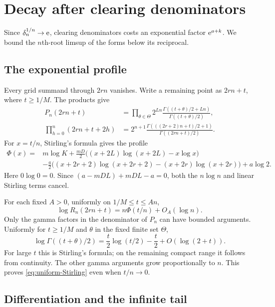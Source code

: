 \section{Decay after clearing denominators}\label{sec:decay}

Since $\delta_n^{1/n}\to\mathrm e$, clearing denominators costs an
exponential factor $\mathrm e^{a+k}$. We bound the $n$th-root limsup
of the forms below its reciprocal.

\subsection{The exponential profile}

Every grid summand through $2rn$ vanishes. Write a remaining
point as $2rn+t$, where $t\ge1/M$. The products give
\begin{align*}
 P_n(2rn+t)
 &=\prod_{\theta\in\Theta}2^{Ln}
             \frac{\Gamma((t+\theta)/2+Ln)}{\Gamma((t+\theta)/2)},\\
 \prod_{h=0}^n(2rn+t+2h)
 &=2^{n+1}
      \frac{\Gamma(((2r+2)n+t)/2+1)}{\Gamma((2rn+t)/2)}.
\end{align*}
For $x=t/n$, Stirling's formula gives the profile
\begin{equation}\label{eq:Phi}
 \begin{split}
 \Phi(x)={}&m\log K
   +\frac{mD}{2}\bigl((x+2L)\log(x+2L)-x\log x\bigr)\\
 &-\frac a2\bigl((x+2r+2)\log(x+2r+2)
                    -(x+2r)\log(x+2r)\bigr)+a\log2.
 \end{split}
\end{equation}
Here $0\log0=0$. Since $(a-mDL)+mDL-a=0$, both the
$n\log n$ and linear Stirling terms cancel.

For each fixed $A>0$, uniformly on $1/M\le t\le An$,
\begin{equation}\label{eq:uniform-Stirling}
 \log R_n(2rn+t)=n\Phi(t/n)+O_A(\log n).
\end{equation}
Only the gamma factors in the denominator of $P_n$ can have
bounded arguments. Uniformly for $t\ge1/M$ and
$\theta$ in the fixed finite set $\Theta$,
\[
 \log\Gamma((t+\theta)/2)
      =\frac t2\log(t/2)-\frac t2+O(\log(2+t)).
\]
For large $t$ this is Stirling's formula; on the remaining
compact range it follows from continuity. The other gamma
arguments grow proportionally to $n$. This proves
\eqref{eq:uniform-Stirling} even when $t/n\to0$.

\subsection{Differentiation and the infinite tail}

